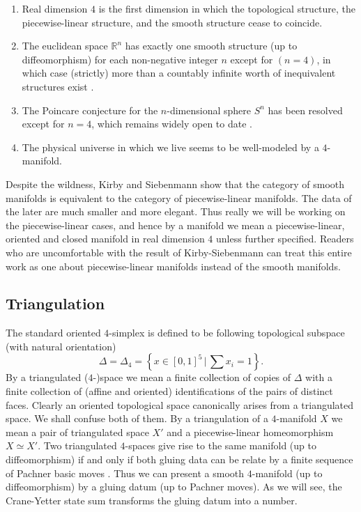 \begin{enumerate}
  \item Real dimension $4$ is the first dimension in which the
        topological structure, the piecewise-linear structure,
        and the smooth structure cease to coincide.
  \item The euclidean space $\mathbb{R}^{n}$ has exactly one
        smooth structure (up to diffeomorphism) for each
        non-negative integer $n$ except for $(n=4)$, in which
        case (strictly) more than a countably infinite worth of
        inequivalent structures exist \cite{?}.
  \item The Poincare conjecture for the $n$-dimensional sphere
        $S^{n}$ has been resolved except for $n=4$, which remains
        widely open to date \cite{?}.
  \item The physical universe in which we live seems to be
        well-modeled by a $4$-manifold.
\end{enumerate}

Despite the wildness, Kirby and Siebenmann
\cite{kirby-siebenmann} \cite{turaev-qiok-3-manifolds} show that
the category of smooth manifolds is equivalent to the category of
piecewise-linear manifolds. The data of the later are much
smaller and more elegant. Thus really we will be working on the
piecewise-linear cases, and hence by a manifold we mean a
piecewise-linear, oriented and closed manifold in real dimension
$4$ unless further specified. Readers who are uncomfortable with
the result of Kirby-Siebenmann can treat this entire work as one
about piecewise-linear manifolds instead of the smooth manifolds.

\subsection{Triangulation}

The standard
oriented $4$-simplex is defined to be following topological
subspace (with natural orientation)
$$\Delta = \Delta_{4} = \left\{x \in [0,1]^{5} \,|\, \sum x_{i} = 1 \right\}.$$
By a triangulated ($4$-)space we mean a finite collection of
copies of $\Delta$ with a finite collection of (affine and
oriented) identifications of the pairs of distinct faces. Clearly
an oriented topological space canonically arises from a
triangulated space. We shall confuse both of them. By a
triangulation of a $4$-manifold $X$ we mean a pair of
triangulated space $X'$ and a piecewise-linear homeomorphism
$X \simeq X'$. Two triangulated $4$-spaces give rise to the same
manifold (up to diffeomorphism) if and only if both gluing data
can be relate by a finite sequence of Pachner basic moves
\cite{?}. Thus we can present a smooth $4$-manifold (up to
diffeomorphism) by a gluing datum (up to Pachner moves). As we
will see, the Crane-Yetter state sum transforms the gluing datum
into a number.

